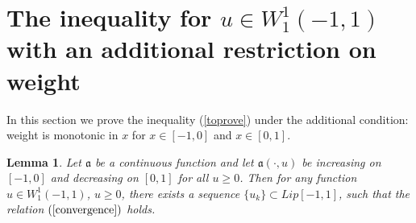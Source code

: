 \documentclass[12pt]{article}
\renewcommand{\ge}{\geqslant}
\newtheorem{lm}{Lemma}
\newcommand{\W}{W_1^1}
\begin{document}
\section{The inequality for $u \in \W(-1, 1)$ with an additional restriction on weight}
\label{ASC}

In this section we prove the inequality (\ref{toprove}) under the additional condition:
weight is monotonic in $x$ for $x \in [-1, 0]$ and $x \in [0, 1]$.

\begin{lm}
\label{Wapprox}
Let $\mathfrak a$ be a continuous function
and let $\mathfrak a(\cdot, u)$ be increasing on $[-1, 0]$ and decreasing on $[0, 1]$ for all $u \ge 0$.
Then for any function $u \in \W(-1, 1)$, $u \ge 0$,
there exists a sequence $\{u_k\} \subset Lip[-1, 1]$, such that the relation $(\ref{convergence})$ holds.
\end{lm}
\end{document}
